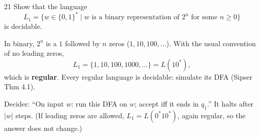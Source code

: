 \begin{question}{21}
Show that the language
\[L_1=\{w\in\{0,1\}^*\mid w \text{ is a binary representation of } 2^n \text{ for some } n\ge 0\}\]
is decidable.
\end{question}
\begin{soln}
In binary, $2^n$ is a $1$ followed by $n$ zeros ($1,10,100,\dots$). With the usual convention of no leading zeros,
\[
L_1=\{1,10,100,1000,\dots\}=L(10^*),
\]
which is \textbf{regular}. Every regular language is decidable: simulate its DFA (Sipser Thm 4.1).

\begin{center}
\end{center}

Decider: ``On input $w$: run this DFA on $w$; accept iff it ends in $q_1$.'' It halts after $|w|$ steps.
(If leading zeros are allowed, $L_1=L(0^*10^*)$, again regular, so the answer does not change.)
\end{soln}

